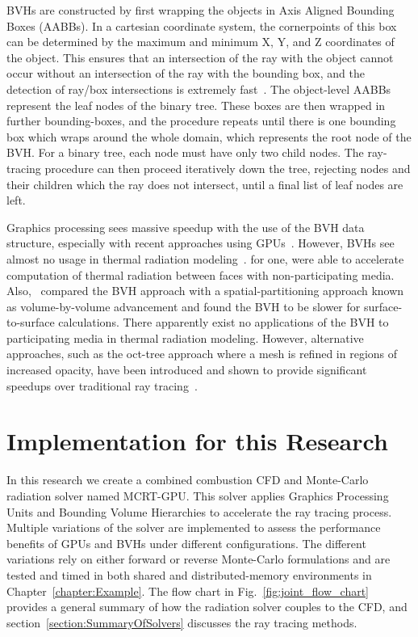 BVHs are constructed by first wrapping the objects in Axis Aligned Bounding Boxes (AABBs). In a cartesian coordinate system, the cornerpoints of this box can be determined by the maximum and minimum X, Y, and Z coordinates of the object.
This ensures that an intersection of the ray with the object cannot occur without an intersection of the ray with the bounding box, and the detection of ray/box intersections is extremely fast~\cite{Kay1986RayScenes}.
The object-level AABBs represent the leaf nodes of the binary tree. These boxes are then wrapped in further bounding-boxes, and the procedure repeats until there is one bounding box which wraps around the whole domain, which represents the root node of the BVH. 
For a binary tree, each node must have only two child nodes. The ray-tracing procedure can then proceed iteratively down the tree, rejecting nodes and their children which the ray does not intersect, until a final list of leaf nodes are left.

Graphics processing sees massive speedup with the use of the BVH data structure, especially with recent approaches using GPUs~\cite{Nery2013ParallelGPGPUs,Meister2021ATracing,Karras2012MaximizingTrees}.
However, BVHs see almost no usage in thermal radiation modeling~\cite{Liu2020TheFlames}.
\citet{Kuczynskia2014RadiationBoundaries} for one, were able to accelerate computation of thermal radiation between faces with non-participating media. 
Also,~\citet{Mazumder2006MethodsTransport} compared the BVH approach with a spatial-partitioning approach known as volume-by-volume advancement and found the BVH to be slower for surface-to-surface calculations. 
There apparently exist no applications of the BVH to participating media in thermal radiation modeling. However, alternative approaches, such as the oct-tree approach where a mesh is refined in regions of increased opacity, have been introduced and shown to provide significant speedups over traditional ray tracing~\cite{Saftly2013UsingNote,Villefranque2019AAtmospheres}.

\section{Implementation for this Research} \label{section:ModelForThisStudy}
In this research we create a combined combustion CFD and Monte-Carlo radiation solver named MCRT-GPU. This solver applies Graphics Processing Units and Bounding Volume Hierarchies to accelerate the ray tracing process. 
Multiple variations of the solver are implemented to assess the performance benefits of GPUs and BVHs under different configurations.
The different variations rely on either forward or reverse Monte-Carlo formulations and are tested and timed in both shared and distributed-memory environments in Chapter~\ref{chapter:Example}.
The flow chart in Fig.~\ref{fig:joint_flow_chart} provides a general summary of how the radiation solver couples to the CFD, and section~\ref{section:SummaryOfSolvers} discusses the ray tracing methods.


